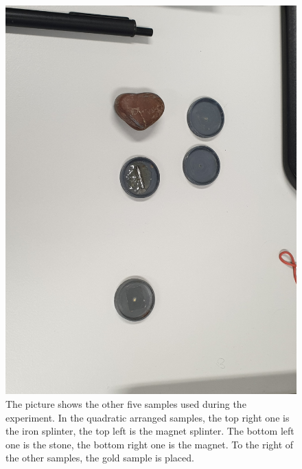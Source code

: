 \begin{figure}[ht]
	\includegraphics[scale=0.1,angle=0]{Bild/samples}
	\centering
	\caption[Picture of the other samples]{\small The picture shows the other five samples used during the experiment. In the quadratic arranged samples, the top right one is the iron splinter, the top left is the magnet splinter. The bottom left one is the stone, the bottom right one is the magnet. To the right of the other samples, the gold sample is placed.}
	\label{samples}
\end{figure}